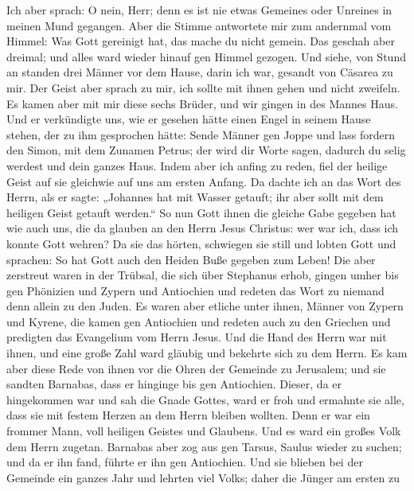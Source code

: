  Ich aber sprach: O nein, Herr; denn es ist nie etwas
Gemeines oder Unreines in meinen Mund gegangen.  Aber die
Stimme antwortete mir zum andernmal vom Himmel: Was Gott gereinigt hat,
das mache du nicht gemein.  Das geschah aber dreimal; und
alles ward wieder hinauf gen Himmel gezogen.  Und siehe,
von Stund an standen drei Männer vor dem Hause, darin ich war, gesandt
von Cäsarea zu mir.  Der Geist aber sprach zu mir, ich
sollte mit ihnen gehen und nicht zweifeln. Es kamen aber mit mir diese
sechs Brüder, und wir gingen in des Mannes Haus.  Und er
verkündigte uns, wie er gesehen hätte einen Engel in seinem Hause
stehen, der zu ihm gesprochen hätte: Sende Männer gen Joppe und lass
fordern den Simon, mit dem Zunamen Petrus;  der wird dir
Worte sagen, dadurch du selig werdest und dein ganzes Haus.
 Indem aber ich anfing zu reden, fiel der heilige Geist auf
sie gleichwie auf uns am ersten Anfang.  Da dachte ich an
das Wort des Herrn, als er sagte: „Johannes hat mit Wasser getauft; ihr
aber sollt mit dem heiligen Geist getauft werden.``  So nun
Gott ihnen die gleiche Gabe gegeben hat wie auch uns, die da glauben an
den Herrn Jesus Christus: wer war ich, dass ich konnte Gott wehren?
 Da sie das hörten, schwiegen sie still und lobten Gott und
sprachen: So hat Gott auch den Heiden Buße gegeben zum Leben!
 Die aber zerstreut waren in der Trübsal, die sich über
Stephanus erhob, gingen umher bis gen Phönizien und Zypern und
Antiochien und redeten das Wort zu niemand denn allein zu den Juden.
 Es waren aber etliche unter ihnen, Männer von Zypern und
Kyrene, die kamen gen Antiochien und redeten auch zu den Griechen und
predigten das Evangelium vom Herrn Jesus.  Und die Hand des
Herrn war mit ihnen, und eine große Zahl ward gläubig und bekehrte sich
zu dem Herrn.  Es kam aber diese Rede von ihnen vor die
Ohren der Gemeinde zu Jerusalem; und sie sandten Barnabas, dass er
hinginge bis gen Antiochien.  Dieser, da er hingekommen war
und sah die Gnade Gottes, ward er froh und ermahnte sie alle, dass sie
mit festem Herzen an dem Herrn bleiben wollten.  Denn er
war ein frommer Mann, voll heiligen Geistes und Glaubens. Und es ward
ein großes Volk dem Herrn zugetan.  Barnabas aber zog aus
gen Tarsus, Saulus wieder zu suchen;  und da er ihn fand,
führte er ihn gen Antiochien. Und sie blieben bei der Gemeinde ein
ganzes Jahr und lehrten viel Volks; daher die Jünger am ersten zu
